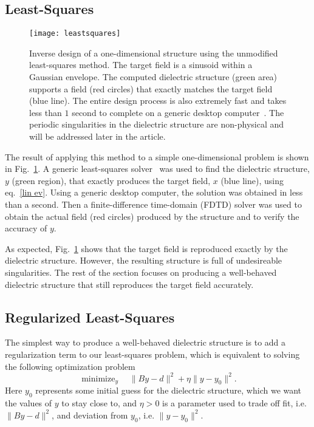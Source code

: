 \documentclass[10pt,letterpaper]{article}
\DeclareMathOperator*{\minimize}{minimize}
\begin{document}
\subsection{Least-Squares}
\begin{figure}[htbp]\centering
\texttt{[image: leastsquares]}
\caption{Inverse design of a one-dimensional structure using the unmodified least-squares method. The target field is a sinusoid within a Gaussian envelope. The computed dielectric structure (green area) supports a field (red circles) that exactly matches the target field (blue line). The entire design process is also extremely fast and takes less than $1$ second to complete on a generic desktop computer~\cite{mycomp}. The periodic singularities in the dielectric structure are non-physical and will be addressed later in the article.}
\label{ls pic}\end{figure}
The result of applying this method to a simple one-dimensional problem is shown in Fig.~\ref{ls pic}. A generic least-squares solver~\cite{cholmod} was used to find the dielectric structure, $y$ (green region), that exactly produces the target field, $x$ (blue line), using eq.~\eqref{lin ev}. Using a generic desktop computer, the solution was obtained in less than a second. Then a finite-difference time-domain (FDTD) solver was used to obtain the actual field (red circles) produced by the structure and to verify the accuracy of $y$.  

As expected, Fig.~\ref{ls pic} shows that the target field is reproduced exactly by the dielectric structure. However, the resulting structure is full of undesireable singularities. The rest of the section focuses on producing a well-behaved dielectric structure that still reproduces the target field accurately.

\subsection{Regularized Least-Squares}
The simplest way to produce a well-behaved dielectric structure is to add a regularization term to our least-squares problem, 
which is equivalent to solving the following optimization problem
\begin{equation}
\minimize_{y}\quad \|By-d\|^2 + \eta\|y-y_0\|^2.
\label{regls alt} \end{equation}
Here $y_0$ represents some initial guess for the dielectric structure, which we want the values of $y$ to stay close to, and $\eta>0$ is a parameter used to trade off fit, i.e. $\|By-d\|^2$, and deviation from $y_0$, i.e. $\|y-y_0\|^2$.
\end{document}
